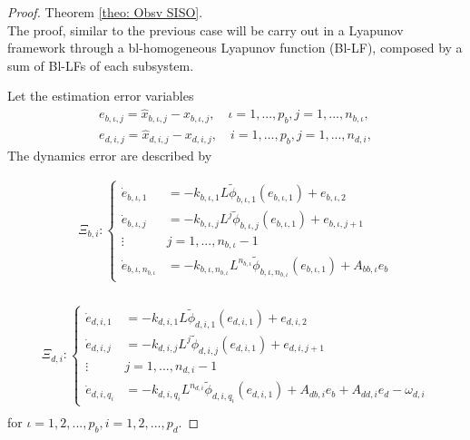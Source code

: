 \documentclass[11pt,letterpaper,twoside,openright]{report}
\begin{document}
\begin{proof}{Theorem \ref{theo: Obsv SISO}. \\}
	The proof, similar to the previous case will be carry out in a Lyapunov framework through a bl-homogeneous Lyapunov function (Bl-LF), composed by a sum of Bl-LFs of each subsystem.
	
	Let the estimation error variables 
	\begin{equation}
		\begin{split}\label{error variables}
			e_{b,\iota,j}=\hat{x}_{b,\iota,j}-x_{b,\iota,j}, \quad \iota=1,...,p_b, j=1,...,n_{b,\iota}, \\
			e_{d,i,j}=\hat{x}_{d,i,j}-x_{d,i,j}, \quad i=1,...,p_b, j=1,...,n_{d,i},
		\end{split}
	\end{equation}
	The dynamics error are described by

\begin{equation}
	\begin{split}\label{eb1}
		\Xi_{b,i}: \left\{
		\begin{array}{rl}
			\dot{e}_{b,\iota,1} &= -k_{b,\iota,1}L \tilde{\phi}_{b,\iota,1}( e_{b,\iota,1} ) + e_{b,\iota,2} \\
			\dot{e}_{b,\iota,j} &= -k_{b,\iota,j}L^{j} \tilde{\phi}_{b,\iota,j}( e_{b,\iota,1} ) + e_{b,\iota,j+1} \\
			\vdots \quad & j=1,...,n_{b,\iota}-1\\
			\dot{e}_{b,\iota,n_{b,\iota}} &= -k_{b,\iota,n_{b,\iota}}L^{n_{b,\iota}} \tilde{\phi}_{b,\iota,n_{b,\iota}}( e_{b,\iota,1} ) + A_{bb,\iota}e_{b}
		\end{array}
		\right. \\
	\end{split}
\end{equation}

\begin{equation}
	\begin{split}\label{ed1}
		\Xi_{d,i}: \left\{
		\begin{array}{rl}
			\dot{e}_{d,i,1} &= -k_{d,i,1}L \tilde{\phi}_{d,i,1}( e_{d,i,1} ) + e_{d,i,2} \\
			\dot{e}_{d,i,j} &= -k_{d,i,j}L^{j}\tilde{\phi}_{d,i,j}( e_{d,i,1} ) + e_{d,i,j+1} \\
			\vdots \quad & j=1,...,n_{d,i}-1\\
			\dot{e}_{d,i,q_i} &= -k_{d,i,q_i}L^{n_{d,i}} \tilde{\phi}_{d,i,q_i}( e_{d,i,1} ) + A_{db,i}e_b + A_{dd,i}e_d - \omega_{d,i}
		\end{array}
		\right. \\
	\end{split}
\end{equation}
for $\iota=1,2,...,p_b, i=1,2,...,p_d$.


\end{proof}
\end{document}
